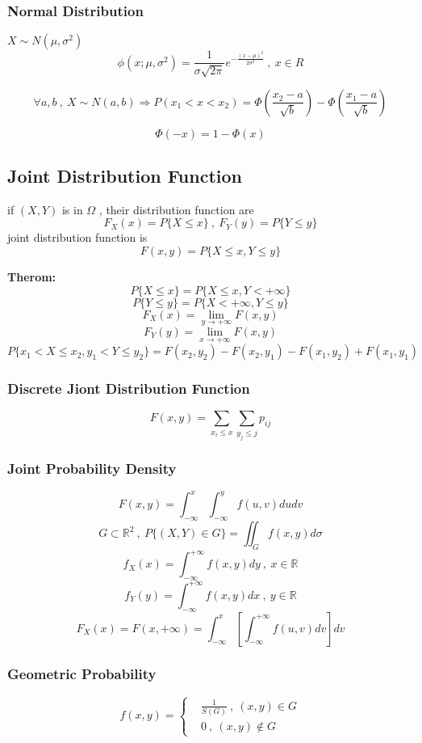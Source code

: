 \documentclass{ctexart}
\begin{document}
\subsubsection{Normal Distribution}
\(X\sim N(\mu , \sigma^2)\)
\[
\phi (x;\mu ,\sigma^2)=\frac{1}{\sigma \sqrt{2\pi}}e^{-\frac{(x-\mu)^2}{2\sigma^2}}\ , \ x\in R\]

\[\forall a,b \ , \ X\sim N(a,b) \Rightarrow P(x_1<x<x_2)=\Phi(\frac{x_2-a}{\sqrt{b}})-\Phi(\frac{x_1-a}{\sqrt{b}})\]

\[\Phi(-x)=1-\Phi(x)\]

\vspace{12 pt}
\subsection{Joint Distribution Function}
if \((X,Y)\) is in \(\Omega\) , their distribution function are
\[F_{X}(x)=P\{X\leq x\}\ , \ F_{Y}(y)=P\{Y\leq y\}\]
joint distribution function is 
\[F(x,y)=P\{X\leq x,Y\leq y\}\]

\textbf{Therom:}
\[P\{X\leq x \}=P\{X\leq x , Y<+\infty\}\]
\[P\{Y\leq y\}=P\{X<+\infty , Y\leq y\}\]
\[F_X(x)=\lim_{y \to +\infty}F(x,y)\]
\[F_Y(y)=\lim_{x \to +\infty}F(x,y)\]
\[P\{x_1<X\leq x_2,y_1<Y\leq y_2\}=F(x_2,y_2)-F(x_2,y_1)-F(x_1,y_2)+F(x_1,y_1)\]

\subsubsection{Discrete Jiont Distribution Function}
\[F(x,y)=\sum_{x_i\leq x}\sum_{y_j\leq j}p_{ij}\]

\vspace{12 pt}
\subsubsection{Joint Probability Density}
\[F(x,y)=\int_{-\infty}^{x}\int_{-\infty}^{y}f(u,v)dudv\]
\[G\subset \mathbb{R}^2\ , \ P\{(X,Y)\in G\}=\iint_{G}f(x,y)d\sigma\]
\[f_X(x)=\int_{-\infty}^{+\infty}f(x,y)dy \ , \ x\in \mathbb{R}\]
\[f_Y(y)=\int_{-\infty}^{+\infty}f(x,y)dx\ , \ y\in \mathbb{R}\]
\[F_X(x)=F(x,+\infty)=\int_{-\infty}^{x}[\int_{-\infty}^{+\infty}f(u,v)dv]dv\]

\vspace{12 pt}
\subsubsection{Geometric Probability}
\[
f(x,y)=
\left\{
\begin{aligned}
&\frac{1}{S(G)}\ , \ (x,y)\in G\\
&0\ , \ (x,y)\notin G
\end{aligned}
\right.
\]
\end{document}
